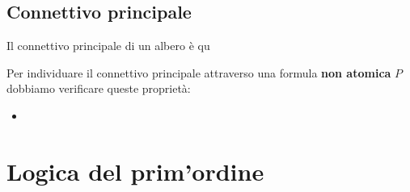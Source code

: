 \documentclass{article}
\begin{document}
\subsection{Connettivo principale}


Il connettivo principale di un albero è qu

Per individuare il connettivo principale attraverso una formula \textbf{non atomica} $P$ dobbiamo verificare queste proprietà:

\begin{itemize}
        \item  

\end{itemize}



\section{Logica del prim'ordine}
\end{document}

